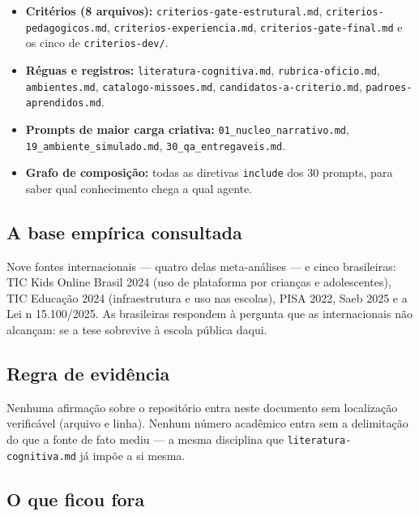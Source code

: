 \documentclass[11pt,a4paper]{article}
\begin{document}
\begin{itemize}
  \item \textbf{Crit\'erios (8 arquivos):} \texttt{criterios-gate-estrutural.md},
        \texttt{criterios-pedagogicos.md}, \texttt{criterios-experiencia.md},
        \texttt{criterios-gate-final.md} e os cinco de \texttt{criterios-dev/}.
  \item \textbf{R\'eguas e registros:} \texttt{literatura-cognitiva.md},
        \texttt{rubrica-oficio.md}, \texttt{ambientes.md}, \texttt{catalogo-missoes.md},
        \texttt{candidatos-a-criterio.md}, \texttt{padroes-aprendidos.md}.
  \item \textbf{Prompts de maior carga criativa:} \texttt{01\_nucleo\_narrativo.md},
        \texttt{19\_ambiente\_simulado.md}, \texttt{30\_qa\_entregaveis.md}.
  \item \textbf{Grafo de composi\c{c}\~ao:} todas as diretivas \texttt{include} dos 30 prompts,
        para saber qual conhecimento chega a qual agente.
\end{itemize}

\subsection{A base emp\'irica consultada}

Nove fontes internacionais --- quatro delas meta-an\'alises --- e cinco brasileiras:
TIC Kids Online Brasil 2024 (uso de plataforma por crian\c{c}as e adolescentes), TIC
Educa\c{c}\~ao 2024 (infraestrutura e uso nas escolas), PISA 2022, Saeb 2025 e a
Lei n\textordmasculine{} 15.100/2025. As brasileiras respondem \`a pergunta que as
internacionais n\~ao alcan\c{c}am: se a tese sobrevive \`a escola p\'ublica daqui.

\subsection{Regra de evid\^encia}

Nenhuma afirma\c{c}\~ao sobre o reposit\'orio entra neste documento sem localiza\c{c}\~ao
verific\'avel (arquivo e linha). Nenhum n\'umero acad\^emico entra sem a delimita\c{c}\~ao do que
a fonte de fato mediu --- a mesma disciplina que \texttt{literatura-cognitiva.md} j\'a imp\~oe a
si mesma.

\subsection{O que ficou fora}
\end{document}
